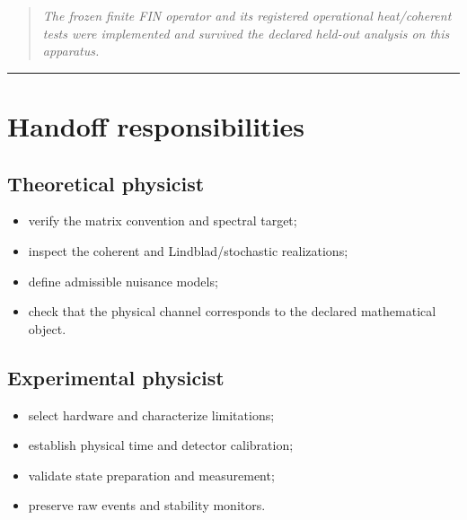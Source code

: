 \documentclass[11pt,a4paper,openany]{report}
\begin{document}
\begin{quote}\itshape
The frozen finite FIN operator and its registered operational heat/\allowbreak{}coherent tests were implemented and survived the declared held-out analysis on this apparatus.

\end{quote}

\par\medskip\hrule\medskip

\chapter{Handoff responsibilities}

\section{Theoretical physicist}

\begin{itemize}
\item 
verify the matrix convention and spectral target;

\item 
inspect the coherent and Lindblad/\allowbreak{}stochastic realizations;

\item 
define admissible nuisance models;

\item 
check that the physical channel corresponds to the declared mathematical object.

\end{itemize}

\section{Experimental physicist}

\begin{itemize}
\item 
select hardware and characterize limitations;

\item 
establish physical time and detector calibration;

\item 
validate state preparation and measurement;

\item 
preserve raw events and stability monitors.

\end{itemize}
\end{document}
